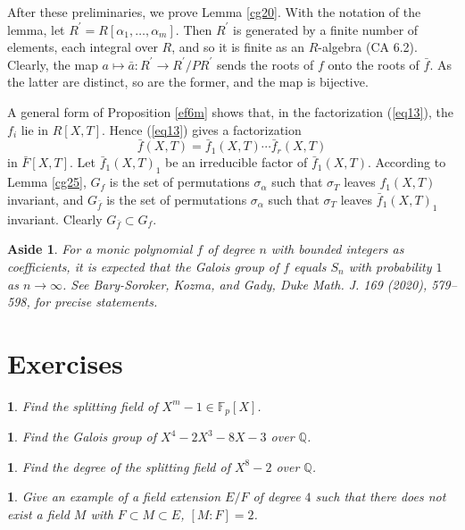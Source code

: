 \documentclass[a4paper,11pt,final,openany]{memoir}
\newtheorem{aside}[X]{Aside}
\newtheorem{exercise}[Y]{}
\theoremstyle{nonumberplain}
\begin{document}
After these preliminaries, we prove Lemma \ref{cg20}. With the notation of the
lemma, let $R^{\prime}=R[\alpha_{1},\ldots,\alpha_{m}]$. Then $R^{\prime}$ is
generated by a finite number of elements, each integral over $R$, and so it is
finite as an $R$-algebra (CA 6.2). Clearly, the map $a\mapsto\bar{a}\colon
R^{\prime}\rightarrow R^{\prime}/PR^{\prime}$ sends the roots of $f$ onto the
roots of $\bar{f}$. As the latter are distinct, so are the former, and the map
is bijective.

A general form of Proposition \ref{ef6m} shows that, in the factorization
(\ref{eq13}), the $f_{i}$ lie in $R[X,T]$. Hence (\ref{eq13}) gives a
factorization%
\[
\bar{f}(X,T)=\bar{f}_{1}(X,T)\cdots\bar{f}_{r}(X,T)
\]
in $\bar{F}[X,T]$. Let $\bar{f}_{1}(X,T)_{1}$ be an irreducible factor of
$\bar{f}_{1}(X,T)$. According to Lemma \ref{cg25}, $G_{f}$ is the set of
permutations $\sigma_{\alpha}$ such that $\sigma_{T}$ leaves $f_{1}(X,T)$
invariant, and $G_{\bar{f}}$ is the set of permutations $\sigma_{\alpha}$ such
that $\sigma_{T}$ leaves $\bar{f}_{1}(X,T)_{1}$ invariant. Clearly $G_{\bar
{f}}\subset G_{f}$.

\begin{aside} For a monic polynomial $f$ of degree $n$ with bounded integers
as coefficients, it is expected that the Galois group of $f$ equals $S_n$
with probability $1$ as $n\rightarrow\infty$. See
Bary-Soroker, Kozma, and Gady, Duke Math. J. 169 (2020), 579--598,
for precise statements.
\end{aside}

\section{Exercises}

\begin{exercise}
\label{x14} Find the splitting field of $X^{m}-1\in\mathbb{F}_{p}[X]$.
\end{exercise}

\begin{exercise}
\label{x15} Find the Galois group of $X^{4}-2X^{3}-8X-3$ over ${\mathbb{Q}}$.
\end{exercise}

\begin{exercise}
\label{x16} Find the degree of the splitting field of $X^{8}- 2$ over
${\mathbb{Q}}$.
\end{exercise}

\begin{exercise}
\label{x17} Give an example of a field extension $E/F$ of degree $4$ such that
there does not exist a field $M$ with $F\subset M\subset E$, $[M\colon F]=2$.
\end{exercise}
\end{document}
